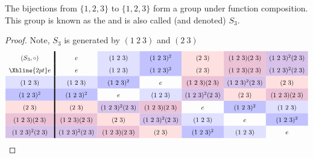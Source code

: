 \documentclass{ximera}
\begin{document}
\begin{example}
  The bijections from $\{1,2,3\}$ to $\{1,2,3\}$ form a group under
  function composition. This group is known as the  and is also called (and denoted) $S_3$.
  \begin{proof}
    Note, $S_3$ is generated by $(1\ 2\ 3)$ and $(2\ 3)$
    \begin{gather*}
      \renewcommand{\arraystretch}{1.6}
      \begin{array}{c!{\vline width 2pt}cccccc}
        (S_3,\circ)& e     & (1\ 2\ 3)\cellcolor{blue!12!white}     & (1\ 2\ 3)^2\cellcolor{blue!24!white}   & (2\ 3) \cellcolor{red!12!white}    & (1\ 2\ 3) (2\ 3) \cellcolor{blue!33!red!24!white}  & (1\ 2\ 3)^2 (2\ 3)\cellcolor{blue!66!red!24!white} \\  \Xhline{2pt}
        e          & e     & (1\ 2\ 3)\cellcolor{blue!12!white}    & (1\ 2\ 3)^2\cellcolor{blue!24!white}   & (2\ 3) \cellcolor{red!12!white}    & (1\ 2\ 3) (2\ 3) \cellcolor{blue!33!red!24!white}   & (1\ 2\ 3)^2(2\ 3) \cellcolor{blue!66!red!24!white} \\  
        (1\ 2\ 3)\cellcolor{blue!12!white}         & (1\ 2\ 3)\cellcolor{blue!12!white}    & (1\ 2\ 3)^2\cellcolor{blue!24!white}   & e     & (1\ 2\ 3)(2\ 3)\cellcolor{blue!33!red!24!white} & (1\ 2\ 3)^2(2\ 3) \cellcolor{blue!66!red!24!white}    & (2\ 3) \cellcolor{red!12!white}   \\  
        (1\ 2\ 3)^2\cellcolor{blue!24!white}        & (1\ 2\ 3)^2\cellcolor{blue!24!white}   & e     & (1\ 2\ 3)\cellcolor{blue!12!white}    & (1\ 2\ 3)^2 (2\ 3) \cellcolor{blue!66!red!24!white}   & (2\ 3) \cellcolor{red!12!white} & (1\ 2\ 3)(2\ 3) \cellcolor{blue!33!red!24!white}    \\  
        (2\ 3) \cellcolor{red!12!white}         & (2\ 3) \cellcolor{red!12!white}    & (1\ 2\ 3)^2(2\ 3) \cellcolor{blue!66!red!24!white}   & (1\ 2\ 3) (2\ 3) \cellcolor{blue!33!red!24!white} & e     & (1\ 2\ 3)^2\cellcolor{blue!24!white}    & (1\ 2\ 3)\cellcolor{blue!12!white}   \\  
        (1\ 2\ 3) (2\ 3) \cellcolor{blue!33!red!24!white}        & (1\ 2\ 3)(2\ 3) \cellcolor{blue!33!red!24!white}   & (2\ 3) \cellcolor{red!12!white} & (1\ 2\ 3)^2(2\ 3) \cellcolor{blue!66!red!24!white}    & (1\ 2\ 3)\cellcolor{blue!12!white}   & e     & (1\ 2\ 3)^2\cellcolor{blue!24!white}    \\  
        (1\ 2\ 3)^2 (2\ 3)\cellcolor{blue!66!red!24!white}      & (1\ 2\ 3)^2 (2\ 3)\cellcolor{blue!66!red!24!white} & (1\ 2\ 3)(2\ 3) \cellcolor{blue!33!red!24!white}    & (2\ 3) \cellcolor{red!12!white}   & (1\ 2\ 3)^2\cellcolor{blue!24!white}    & (1\ 2\ 3)\cellcolor{blue!12!white}   & e     \\  
      \end{array}
    \end{gather*}
  \end{proof}
\end{example}
\end{document}
